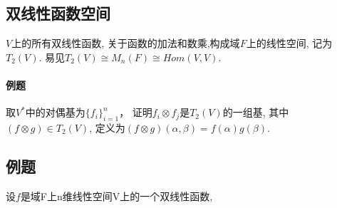 \subsection{双线性函数空间}
$V$上的所有双线性函数, 关于函数的加法和数乘,构成域$F$上的线性空间, 
记为$T_2(V)$.
易见$T_2(V) \cong M_n(F) \cong Hom(V,V)$.

\paragraph{例题}
取$V^*$中的对偶基为$\{f_i\}_{i=1}^n$，
证明$f_i \otimes f_j$是$T_2(V)$的一组基,
其中$(f \otimes g) \in T_2(V)$, 
定义为$(f \otimes g)(\alpha, \beta) = f(\alpha)g(\beta)$.


\subsection{例题}
设$f$是域F上n维线性空间V上的一个双线性函数,
